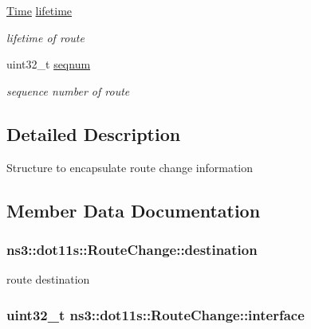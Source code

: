 \begin{DoxyCompactItemize}
\hyperlink{classns3_1_1Time}{Time} \hyperlink{structns3_1_1dot11s_1_1RouteChange_a1048103d6ec996f62e007242a925a2e4}{lifetime}
\begin{DoxyCompactList}\small\item\em lifetime of route \end{DoxyCompactList}\item 
uint32\+\_\+t \hyperlink{structns3_1_1dot11s_1_1RouteChange_a72a97cf7f4be4037eaf0773c9d514f3e}{seqnum}
\begin{DoxyCompactList}\small\item\em sequence number of route \end{DoxyCompactList}\end{DoxyCompactItemize}


\subsection{Detailed Description}
Structure to encapsulate route change information 

\subsection{Member Data Documentation}
\subsubsection[{\texorpdfstring{destination}{destination}}]{ ns3\+::dot11s\+::\+Route\+Change\+::destination}\hypertarget{structns3_1_1dot11s_1_1RouteChange_aa7b4a08b0b376dc5ca8577f11971d7b3}{}\label{structns3_1_1dot11s_1_1RouteChange_aa7b4a08b0b376dc5ca8577f11971d7b3}


route destination 

\subsubsection[{\texorpdfstring{interface}{interface}}]{\setlength{\rightskip}{0pt plus 5cm}uint32\+\_\+t ns3\+::dot11s\+::\+Route\+Change\+::interface}\hypertarget{structns3_1_1dot11s_1_1RouteChange_ad4f435c0de351fb32d03abf6416975ae}{}\label{structns3_1_1dot11s_1_1RouteChange_ad4f435c0de351fb32d03abf6416975ae}


